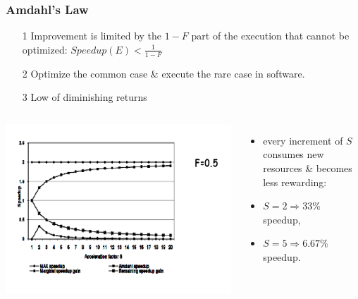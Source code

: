 \documentclass{beamer}
\begin{document}
\begin{frame}[fragile,t]
\frametitle{Amdahl's Law}

\begin{itemize}
    \item[1] Improvement is limited by the $1-F$ part of the execution 
                that cannot be optimized:
                $Speedup(E) < \frac{1}{1-F}$\medskip

    \item[2] Optimize the common case \& execute the rare case in software.

    \item[3] Low of diminishing returns\smallskip

\end{itemize}

\vspace{-4ex}
\begin{columns}
\includegraphics[width=55ex]{Ch1Figs/AmdhalDimRet}\pause
{}\vspace{-3ex}
\begin{itemize}
    \item every increment of $S$ consumes new resources \& becomes less rewarding: 
    \item $S = 2 \Rightarrow 33\%$ speedup,
    \item $S = 5 \Rightarrow 6.67\%$ speedup.
\end{itemize}
\end{columns}

\end{frame}
\end{document}
